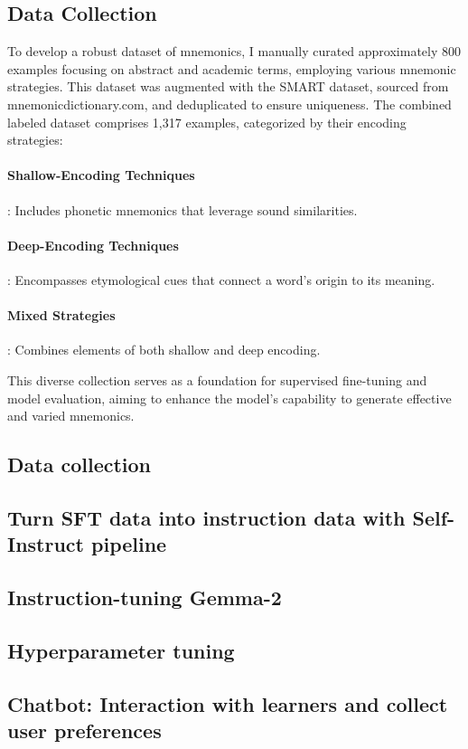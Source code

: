 \documentclass[11pt, onecolumn]{article}
\newcounter{para}
\begin{document}
\subsection{Data Collection}

To develop a robust dataset of mnemonics, I manually curated approximately 800 examples focusing on abstract and academic terms, employing various mnemonic strategies. This dataset was augmented with the SMART dataset, sourced from mnemonicdictionary.com, and deduplicated to ensure uniqueness. The combined labeled dataset comprises 1,317 examples, categorized by their encoding strategies:

\paragraph{Shallow-Encoding Techniques}: Includes phonetic mnemonics that leverage sound similarities.
\paragraph{Deep-Encoding Techniques}: Encompasses etymological cues that connect a word's origin to its meaning.
\paragraph{Mixed Strategies}: Combines elements of both shallow and deep encoding.

This diverse collection serves as a foundation for supervised fine-tuning and model evaluation, aiming to enhance the model's capability to generate effective and varied mnemonics.

\subsection{Data collection}
\subsection{Turn \textsc{SFT} data into instruction data with Self-Instruct pipeline}
\subsection{Instruction-tuning Gemma-2}
\subsection{Hyperparameter tuning}
\subsection{Chatbot: Interaction with learners and collect user preferences}
\end{document}
